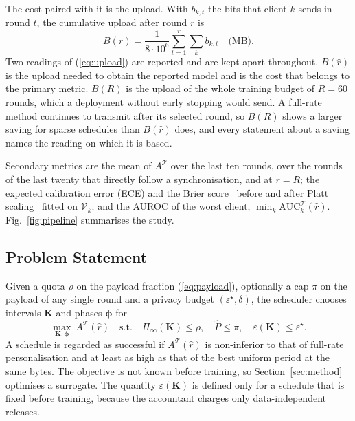 \documentclass[journal]{IEEEtran}
\begin{document}
The cost paired with it is the upload. With $b_{k,t}$ the bits that client $k$ sends in round $t$, the cumulative upload after round $r$ is
\begin{equation}
B(r)=\frac{1}{8\cdot10^{6}}\sum_{t=1}^{r}\sum_{k}b_{k,t}\quad\text{(MB)}.
\label{eq:upload}
\end{equation}
Two readings of (\ref{eq:upload}) are reported and are kept apart throughout. $B(\hat r)$ is the upload needed to obtain the reported model and is the cost that belongs to the primary metric. $B(R)$ is the upload of the whole training budget of $R=60$ rounds, which a deployment without early stopping would send. A full-rate method continues to transmit after its selected round, so $B(R)$ shows a larger saving for sparse schedules than $B(\hat r)$ does, and every statement about a saving names the reading on which it is based.

Secondary metrics are the mean of $A^{\mathcal T}$ over the last ten rounds, over the rounds of the last twenty that directly follow a synchronisation, and at $r=R$; the expected calibration error (ECE) and the Brier score~\cite{vancalster2019} before and after Platt scaling~\cite{platt1999} fitted on $\mathcal V_k$; and the AUROC of the worst client, $\min_k\mathrm{AUC}^{\mathcal T}_k(\hat r)$. Fig.~\ref{fig:pipeline} summarises the study.

\subsection{Problem Statement}
Given a quota $\rho$ on the payload fraction (\ref{eq:payload}), optionally a cap $\pi$ on the payload of any single round and a privacy budget $(\varepsilon^\star,\delta)$, the scheduler chooses intervals $\mathbf K$ and phases $\boldsymbol\phi$ for
\begin{equation}
\max_{\mathbf K,\boldsymbol\phi}\ A^{\mathcal T}(\hat r)\quad\text{s.t.}\quad\Pi_\infty(\mathbf K)\le\rho,\quad\hat P\le\pi,\quad\varepsilon(\mathbf K)\le\varepsilon^\star .
\label{eq:problem}
\end{equation}
A schedule is regarded as successful if $A^{\mathcal T}(\hat r)$ is non-inferior to that of full-rate personalisation and at least as high as that of the best uniform period at the same bytes. The objective is not known before training, so Section~\ref{sec:method} optimises a surrogate. The quantity $\varepsilon(\mathbf K)$ is defined only for a schedule that is fixed before training, because the accountant charges only data-independent releases.
\end{document}
